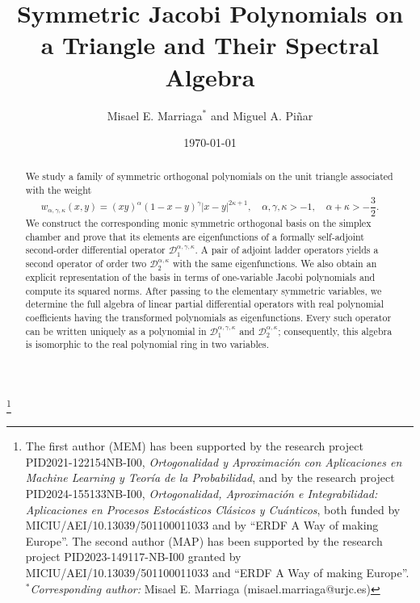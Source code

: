 \documentclass[reqno,10pt]{amsart}
\theoremstyle{plain}
\numberwithin{equation}{section}
\numberwithin{figure}{section}
\begin{document}
\title[Symmetric Jacobi Polynomials on a Triangle: Spectral Algebra]{Symmetric Jacobi Polynomials on a Triangle and Their Spectral Algebra}

\author[M. E. Marriaga and M. A.  Pi\~nar]
{Misael E. Marriaga$^*$ and Miguel A. Pi\~nar}


\address[M. E. Marriaga]{Departamento de Matem\'atica Aplicada, Ciencia e Ingenier\'ia de Materiales y
	Tecnolog\'ia Electr\'onica, Universidad Rey Juan Carlos (Spain)}
\address[M. A.  Pi\~nar]{
	Departamento de Matem\'{a}tica Aplicada, Facultad de Ciencias. Universidad de Granada (Spain)}

\thanks{The first author (MEM) has been supported by the research project PID2021-122154NB-I00, \emph{Ortogonalidad y Aproximación con Aplicaciones en Machine Learning y Teoría de la Probabilidad}, and by the research project PID2024-155133NB-I00, \emph{Ortogonalidad, Aproximación e Integrabilidad: Aplicaciones en Procesos Estocásticos Clásicos y Cuánticos}, both funded by MICIU/AEI/10.13039/501100011033 and by ``ERDF A Way of making Europe''. The second author (MAP) has been supported by the research project PID2023-149117-NB-I00 granted by MICIU/AEI/10.13039/501100011033 and ``ERDF A Way of making Europe''.\\
$^*$\textit{Corresponding author:} Misael E. Marriaga (misael.marriaga@urjc.es)}

\date{\today}

\begin{abstract}
We study a family of symmetric orthogonal polynomials on the unit triangle
associated with the weight
\[
w_{\alpha,\gamma,\kappa}(x,y)
=
(xy)^\alpha(1-x-y)^\gamma |x-y|^{2\kappa+1},
\quad \alpha,\gamma,\kappa>-1,\quad
\alpha+\kappa>-\frac32.
\]
We construct the corresponding monic symmetric orthogonal basis on the simplex chamber
and prove that its elements are eigenfunctions of a formally self-adjoint second-order
differential operator
\(\mathcal D_1^{\alpha,\gamma,\kappa}\). A pair of adjoint ladder operators
yields a second operator of order two
\(\mathcal D_2^{\alpha,\kappa}\) with the same eigenfunctions. We also obtain
an explicit representation of the basis in terms of one-variable Jacobi
polynomials and compute its squared norms. After passing to the elementary
symmetric variables, we determine the full algebra of linear partial
differential operators with real polynomial coefficients having the transformed
polynomials as eigenfunctions. Every such operator can be written uniquely
as a polynomial in
\(\mathcal D_1^{\alpha,\gamma,\kappa}\) and
\(\mathcal D_2^{\alpha,\kappa}\); consequently, this algebra is isomorphic to
the real polynomial ring in two variables.
\end{abstract}
\end{document}

